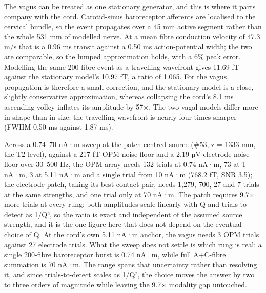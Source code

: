 \documentclass[11pt]{article}
\newcommand{\revised}[1]{#1}
\begin{document}
The vagus can be treated as one stationary generator, and this is where
it parts company with the cord. Carotid-sinus baroreceptor afferents are
localised to the cervical bundle, so the event propagates over a \revised{45 mm}
active segment rather than the whole \revised{531 mm} of modelled nerve. At a mean
fibre conduction velocity of 47.3 m/s that is a \revised{0.96 ms} transit against
a 0.50 ms action-potential width; the two are comparable, so the lumped
approximation holds, with \revised{a 6\% peak error}. Modelling the same
200-fibre event as a travelling wavefront gives \revised{11.69 fT} against the
stationary model's \revised{10.97 fT}, a ratio of \revised{1.065}. \revised{For the vagus,
propagation is therefore a small correction, and the stationary model is
a close, slightly conservative approximation, whereas collapsing the
cord's 8.1 ms ascending volley inflates its amplitude by 57×. The two
vagal models differ more in shape than in size: the travelling
wavefront is nearly four times sharper (FWHM 0.50 ms against 1.87
ms).}

\revised{Across a 0.74--70 nA·m sweep at the patch-centred source (\#53,
z = 1333 mm, the T2 level), against a 217 fT OPM noise floor and a 2.19
µV electrode noise floor over 30--500 Hz, the OPM array needs 132 trials
at 0.74 nA·m, 73 at 1 nA·m, 3 at 5.11 nA·m and a single trial from 10
nA·m (768.2 fT, SNR 3.5); the electrode patch, taking its best contact
pair, needs 1,279, 700, 27 and 7 trials at the same strengths, and one
trial only at 70 nA·m. The patch requires 9.7× more trials at every
rung: both amplitudes scale linearly with Q and trials-to-detect as
1/Q², so the ratio is exact and independent of the assumed source
strength, and it is the one figure here that does not depend on the
eventual choice of Q. At the cord's own 5.11 nA·m anchor, the vagus
needs 3 OPM trials against 27 electrode trials. What the sweep does not
settle is which rung is real: a single 200-fibre baroreceptor burst is
0.74 nA·m, while full A+C-fibre summation is 70 nA·m. The range spans
that uncertainty rather than resolving it, and since trials-to-detect
scales as 1/Q², the choice moves the answer by two to three orders of
magnitude while leaving the 9.7× modality gap untouched.}
\end{document}
